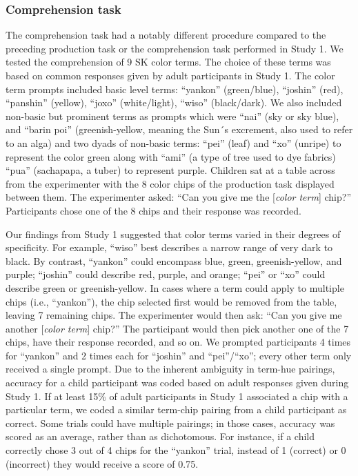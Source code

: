 \documentclass[
  english,
  ,apa7,floatsintext]{apa6}
\begin{document}
\hypertarget{comprehension-task}{%
\subsubsection{Comprehension task}\label{comprehension-task}}

The comprehension task had a notably different procedure compared to the preceding production task or the comprehension task performed in Study 1. We tested the comprehension of 9 SK color terms. The choice of these terms was based on common responses given by adult participants in Study 1. The color term prompts included basic level terms: ``yankon'' (green/blue), ``joshin'' (red), ``panshin'' (yellow), ``joxo'' (white/light), ``wiso'' (black/dark). We also included non-basic but prominent terms as prompts which were ``nai'' (sky or sky blue), and ``barin poi'' (greenish-yellow, meaning the Sun´s excrement, also used to refer to an alga) and two dyads of non-basic terms: ``pei'' (leaf) and ``xo'' (unripe) to represent the color green along with ``ami'' (a type of tree used to dye fabrics) ``pua'' (sachapapa, a tuber) to represent purple. Children sat at a table across from the experimenter with the 8 color chips of the production task displayed between them. The experimenter asked: ``Can you give me the {[}\emph{color term}{]} chip?'' Participants chose one of the 8 chips and their response was recorded.

Our findings from Study 1 suggested that color terms varied in their degrees of specificity. For example, ``wiso'' best describes a narrow range of very dark to black. By contrast, ``yankon'' could encompass blue, green, greenish-yellow, and purple; ``joshin'' could describe red, purple, and orange; ``pei'' or ``xo'' could describe green or greenish-yellow. In cases where a term could apply to multiple chips (i.e., ``yankon''), the chip selected first would be removed from the table, leaving 7 remaining chips. The experimenter would then ask: ``Can you give me another {[}\emph{color term}{]} chip?'' The participant would then pick another one of the 7 chips, have their response recorded, and so on. We prompted participants 4 times for ``yankon'' and 2 times each for ``joshin'' and ``pei''/``xo''; every other term only received a single prompt. Due to the inherent ambiguity in term-hue pairings, accuracy for a child participant was coded based on adult responses given during Study 1. If at least 15\% of adult participants in Study 1 associated a chip with a particular term, we coded a similar term-chip pairing from a child participant as correct. Some trials could have multiple pairings; in those cases, accuracy was scored as an average, rather than as dichotomous. For instance, if a child correctly chose 3 out of 4 chips for the ``yankon'' trial, instead of 1 (correct) or 0 (incorrect) they would receive a score of 0.75.
\end{document}
